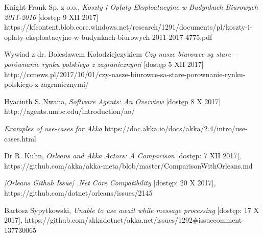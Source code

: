 \begin{thebibliography}{10}%


Knight Frank Sp. z o.o., \emph{Koszty i Opłaty Eksploatacyjne w Budynkach Biurowych 2011-2016} [dostęp 9 XII 2017] 
https://kfcontent.blob.core.windows.net/research/1291/documents/pl/koszty-i-oplaty-eksploatacyjne-w-budynkach-biurowych-2011-2017-4775.pdf

 Wywiad z dr. Bolesławem Kołodziejczykiem \emph{Czy nasze biurowce są stare – porównanie rynku polskiego z zagranicznymi} [dostęp 5 XII 2017]
http://ccnews.pl/2017/10/01/czy-nasze-biurowce-sa-stare-porownanie-rynku-polskiego-z-zagranicznymi/

 Hyacinth S. Nwana, \emph{Software Agents: An Overview} [dostęp 8 X 2017]
http://agents.umbc.edu/introduction/ao/

 \emph{Examples of use-cases for Akka}
https://doc.akka.io/docs/akka/2.4/intro/use-cases.html

Dr R. Kuhn, \emph{Orleans and Akka Actors: A Comparison} [dostęp: 7 XII 2017],
https://github.com/akka/akka-meta/blob/master/ComparisonWithOrleans.md

 \emph{[Orleans Github Issue] .Net Core Compatibility} [dostęp: 20 X 2017],
https://github.com/dotnet/orleans/issues/2145

 Bartosz Sypytkowski, \emph{Unable to use await while message processing} [dostęp: 17 X 2017], 
https://github.com/akkadotnet/akka.net/issues/1292\#issuecomment-137730065


\end{thebibliography}